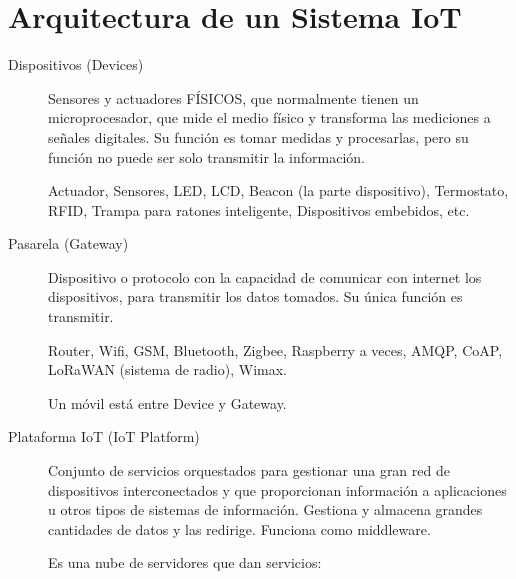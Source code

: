 \documentclass[12pt, twoside, openright]{report} %
\begin{document}
\section{Arquitectura de un Sistema IoT}
\begin{description}
	\item[Dispositivos (Devices)] Sensores y actuadores FÍSICOS, que
	      normalmente tienen un microprocesador, que mide el medio físico y
	      transforma las mediciones a señales digitales. Su función es tomar
	      medidas y procesarlas, pero su función no puede ser solo transmitir la
	      información.

	      Actuador, Sensores, LED, LCD, Beacon (la parte dispositivo), Termostato,
	      RFID, Trampa para ratones inteligente, Dispositivos embebidos, etc.
	\item[Pasarela (Gateway)] Dispositivo o protocolo con la capacidad de
	      comunicar con internet los dispositivos, para transmitir los datos
	      tomados. Su única función es transmitir.

	      Router, Wifi, GSM, Bluetooth, Zigbee, Raspberry a veces, AMQP, CoAP,
	      LoRaWAN (sistema de radio), Wimax.

	      Un móvil está entre Device y Gateway.
	\item[Plataforma IoT (IoT Platform)] Conjunto de servicios
	      orquestados para gestionar una gran red de dispositivos interconectados
	      y que proporcionan información a aplicaciones u otros tipos de sistemas
	      de información. Gestiona y almacena grandes cantidades de datos y las
	      redirige. Funciona como middleware.

	      Es una nube de servidores que dan servicios:


\end{description}
\end{document}
